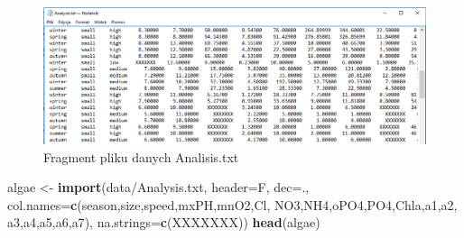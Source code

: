 \documentclass[
]{book}
\newenvironment{Shaded}{\begin{snugshade}}{\end{snugshade}}
\newcommand{\AttributeTok}[1]{\textcolor[rgb]{0.13,0.29,0.53}{#1}}
\newcommand{\FunctionTok}[1]{\textcolor[rgb]{0.13,0.29,0.53}{\textbf{#1}}}
\newcommand{\NormalTok}[1]{#1}
\newcommand{\OtherTok}[1]{\textcolor[rgb]{0.56,0.35,0.01}{#1}}
\newcommand{\StringTok}[1]{\textcolor[rgb]{0.31,0.60,0.02}{#1}}
\theoremstyle{plain}
\theoremstyle{definition}
\theoremstyle{definition}
\theoremstyle{definition}
\theoremstyle{definition}
\theoremstyle{definition}
\theoremstyle{remark}
\begin{document}
\begin{figure}
\includegraphics[width=10.67in]{images/analalysi_foto} \caption{Fragment pliku danych Analisis.txt}\label{fig:foto}
\end{figure}

\begin{Shaded}
\begin{Highlighting}[]
\NormalTok{algae }\OtherTok{\textless{}{-}} \FunctionTok{import}\NormalTok{(}\StringTok{\textquotesingle{}data/Analysis.txt\textquotesingle{}}\NormalTok{, }\AttributeTok{header=}\NormalTok{F, }
                \AttributeTok{dec=}\StringTok{\textquotesingle{}.\textquotesingle{}}\NormalTok{, }
                \AttributeTok{col.names=}\FunctionTok{c}\NormalTok{(}\StringTok{\textquotesingle{}season\textquotesingle{}}\NormalTok{,}\StringTok{\textquotesingle{}size\textquotesingle{}}\NormalTok{,}\StringTok{\textquotesingle{}speed\textquotesingle{}}\NormalTok{,}\StringTok{\textquotesingle{}mxPH\textquotesingle{}}\NormalTok{,}\StringTok{\textquotesingle{}mnO2\textquotesingle{}}\NormalTok{,}\StringTok{\textquotesingle{}Cl\textquotesingle{}}\NormalTok{,}
                            \StringTok{\textquotesingle{}NO3\textquotesingle{}}\NormalTok{,}\StringTok{\textquotesingle{}NH4\textquotesingle{}}\NormalTok{,}\StringTok{\textquotesingle{}oPO4\textquotesingle{}}\NormalTok{,}\StringTok{\textquotesingle{}PO4\textquotesingle{}}\NormalTok{,}\StringTok{\textquotesingle{}Chla\textquotesingle{}}\NormalTok{,}\StringTok{\textquotesingle{}a1\textquotesingle{}}\NormalTok{,}\StringTok{\textquotesingle{}a2\textquotesingle{}}\NormalTok{,}
                            \StringTok{\textquotesingle{}a3\textquotesingle{}}\NormalTok{,}\StringTok{\textquotesingle{}a4\textquotesingle{}}\NormalTok{,}\StringTok{\textquotesingle{}a5\textquotesingle{}}\NormalTok{,}\StringTok{\textquotesingle{}a6\textquotesingle{}}\NormalTok{,}\StringTok{\textquotesingle{}a7\textquotesingle{}}\NormalTok{),}
                \AttributeTok{na.strings=}\FunctionTok{c}\NormalTok{(}\StringTok{\textquotesingle{}XXXXXXX\textquotesingle{}}\NormalTok{))}
\FunctionTok{head}\NormalTok{(algae)}
\end{Highlighting}
\end{Shaded}
\end{document}
